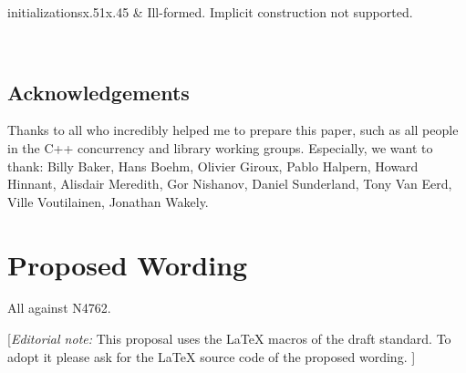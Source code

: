 \begin{LongTable}{ initializations}{}{x{.51\hsize}x{.45\hsize}}
  \br
 \hspace*{1em} \br
 \hspace*{2em} \br
 \hspace*{2em} \br
 \hspace*{1em}\tcode{  \}();     }
  &
        Ill-formed. Implicit construction not supported.

        \\ \rowsep
\end{LongTable}
 

\subsection*{Acknowledgements}

Thanks to all who incredibly helped me to prepare this paper,
such as all people in the C++ concurrency and library working groups.
Especially, we want to thank:
 Billy Baker, Hans Boehm, Olivier Giroux, Pablo Halpern, Howard Hinnant, Alisdair Meredith, Gor Nishanov,
 Daniel Sunderland, Tony Van Eerd, Ville Voutilainen, Jonathan Wakely.

\section*{Proposed Wording}
All against N4762.

{\color{blue}
[{\itshape{}Editorial note:} This proposal uses the LaTeX macros of the draft standard.
        To adopt it please ask for the LaTeX source code of the proposed wording. ]
}


